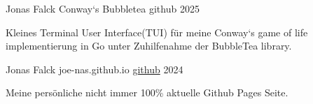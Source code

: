 

\begin{cventries}

\cventry
    {Jonas Falck} %
    {Conway`s Bubbletea} %
    {github} %
    {2025} %
    {
      \begin{cvitems} %
        \item {Kleines Terminal User Interface(TUI) für meine Conway`s game of life implementierung in Go unter Zuhilfenahme der BubbleTea library.}
        \vspace{0.2cm}
        \newline{} 
      \end{cvitems}
    }

    \cventry
    {Jonas Falck} %
    {joe-nas.github.io} %
    {\href{https://github.com/joe-nas/joe-nas.github.io}{github}} %
    {2024} %
    {
      \begin{cvitems} %
        \item {Meine persönliche nicht immer 100\% aktuelle Github Pages Seite.}
        \vspace{0.2cm}
        \newline{} 
      \end{cvitems}
    }


\end{cventries}
